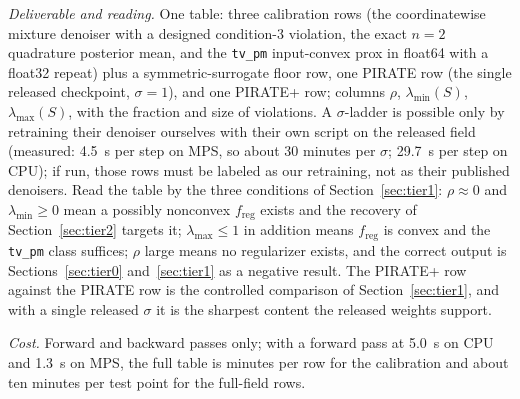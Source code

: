 \documentclass[11pt]{article}
\theoremstyle{definition}
\newcommand{\freg}{f_{\mathrm{reg}}}
\newcommand{\code}[1]{\texttt{#1}}
\begin{document}
\emph{Deliverable and reading.} One table: three calibration rows (the coordinatewise mixture denoiser with a designed condition-3 violation, the exact $n = 2$ quadrature posterior mean, and the \code{tv\_pm} input-convex prox in float64 with a float32 repeat) plus a symmetric-surrogate floor row, one PIRATE row (the single released checkpoint, $\sigma = 1$), and one PIRATE+ row; columns $\rho$, $\lambda_{\min}(S)$, $\lambda_{\max}(S)$, with the fraction and size of violations. A $\sigma$-ladder is possible only by retraining their denoiser ourselves with their own script on the released field (measured: 4.5~s per step on MPS, so about 30 minutes per $\sigma$; 29.7~s per step on CPU); if run, those rows must be labeled as our retraining, not as their published denoisers. Read the table by the three conditions of Section~\ref{sec:tier1}: $\rho \approx 0$ and $\lambda_{\min} \geq 0$ mean a possibly nonconvex $\freg$ exists and the recovery of Section~\ref{sec:tier2} targets it; $\lambda_{\max} \leq 1$ in addition means $\freg$ is convex and the \code{tv\_pm} class suffices; $\rho$ large means no regularizer exists, and the correct output is Sections~\ref{sec:tier0} and~\ref{sec:tier1} as a negative result. The PIRATE+ row against the PIRATE row is the controlled comparison of Section~\ref{sec:tier1}, and with a single released $\sigma$ it is the sharpest content the released weights support.

\emph{Cost.} Forward and backward passes only; with a forward pass at 5.0~s on CPU and 1.3~s on MPS, the full table is minutes per row for the calibration and about ten minutes per test point for the full-field rows.
\end{document}
